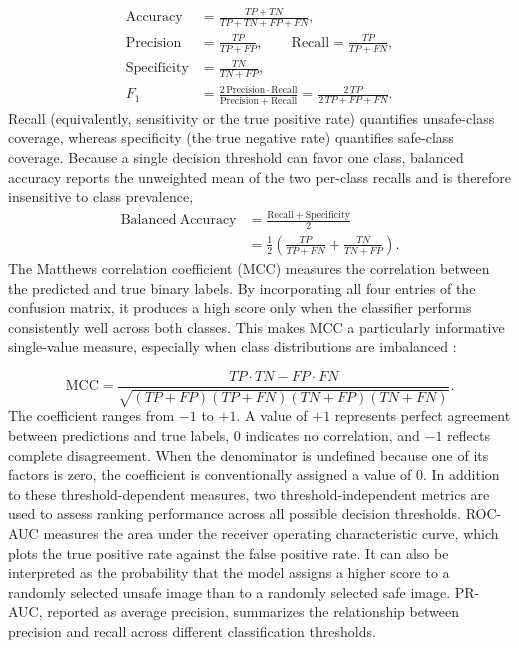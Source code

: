 \documentclass{article}
\begin{document}
\begin{align}
\mathrm{Accuracy} &= \frac{TP + TN}{TP + TN + FP + FN}, \label{eq:acc}\\[2pt]
\mathrm{Precision} &= \frac{TP}{TP + FP}, \qquad
\mathrm{Recall} = \frac{TP}{TP + FN}, \label{eq:prrec}\\[2pt]
\mathrm{Specificity} &= \frac{TN}{TN + FP}, \label{eq:spec}\\[2pt]
F_1 &= \frac{2\,\mathrm{Precision} \cdot \mathrm{Recall}}{\mathrm{Precision} + \mathrm{Recall}}
= \frac{2\,TP}{2\,TP + FP + FN}. \label{eq:f1}
\end{align}
Recall (equivalently, sensitivity or the true positive rate) quantifies unsafe-class coverage, whereas specificity (the true negative rate) quantifies safe-class coverage. Because a single decision threshold can favor one class, balanced accuracy reports the unweighted mean of the two per-class recalls and is therefore insensitive to class prevalence,
\begin{equation}
\begin{split}
\mathrm{Balanced\ Accuracy}
&= \frac{\mathrm{Recall} + \mathrm{Specificity}}{2} \\
&= \frac{1}{2}\!\left(\frac{TP}{TP + FN} + \frac{TN}{TN + FP}\right). \label{eq:bacc}
\end{split}
\end{equation}
The Matthews correlation coefficient (MCC) measures the correlation between the predicted and true binary labels. By incorporating all four entries of the confusion matrix, it produces a high score only when the classifier performs consistently well across both classes. This makes MCC a particularly informative single-value measure, especially when class distributions are imbalanced \cite{chicco2020mcc}:

\begin{equation}
\mathrm{MCC} = \frac{TP \cdot TN - FP \cdot FN}
{\sqrt{(TP{+}FP)(TP{+}FN)(TN{+}FP)(TN{+}FN)}}. \label{eq:mcc}
\end{equation}
The coefficient ranges from $-1$ to $+1$. A value of $+1$ represents perfect agreement between predictions and true labels, $0$ indicates no correlation, and $-1$ reflects complete disagreement. When the denominator is undefined because one of its factors is zero, the coefficient is conventionally assigned a value of $0$. In addition to these threshold-dependent measures, two threshold-independent metrics are used to assess ranking performance across all possible decision thresholds. ROC-AUC measures the area under the receiver operating characteristic curve, which plots the true positive rate against the false positive rate. It can also be interpreted as the probability that the model assigns a higher score to a randomly selected unsafe image than to a randomly selected safe image. PR-AUC, reported as average precision, summarizes the relationship between precision and recall across different classification thresholds.
\end{document}
